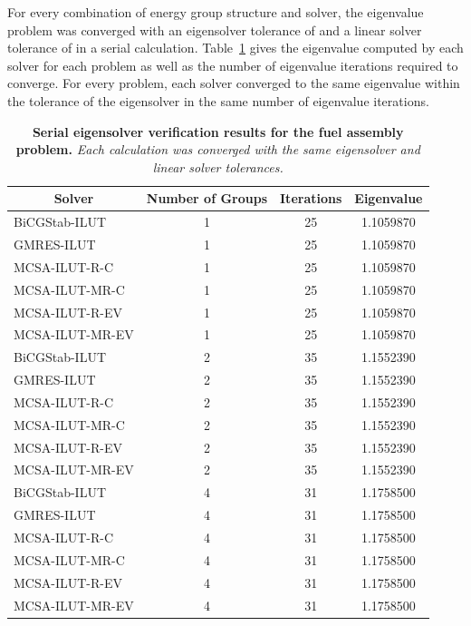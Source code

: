 For every combination of energy group structure and solver, the
eigenvalue problem was converged with an eigensolver tolerance of
 and a linear solver tolerance of  in a serial
calculation. Table~\ref{tab:serial_ev_results} gives the eigenvalue
computed by each solver for each problem as well as the number of
eigenvalue iterations required to converge. For every problem, each
solver converged to the same eigenvalue within the tolerance of the
eigensolver in the same number of eigenvalue iterations.
\begin{table}[h!]
  \begin{center}
    \begin{tabular}{lccc}\hline\hline
      \multicolumn{1}{c}{\textbf{Solver}} & 
      \multicolumn{1}{c}{\textbf{Number of Groups}} & 
      \multicolumn{1}{c}{\textbf{Iterations}} &
      \multicolumn{1}{c}{\textbf{Eigenvalue}} \\
      \hline
      BiCGStab-ILUT & 1 & 25 & 1.1059870 \\
      GMRES-ILUT & 1 & 25 & 1.1059870 \\
      MCSA-ILUT-R-C & 1 & 25 & 1.1059870 \\
      MCSA-ILUT-MR-C & 1 & 25 & 1.1059870 \\
      MCSA-ILUT-R-EV & 1 & 25 & 1.1059870 \\
      MCSA-ILUT-MR-EV & 1 & 25 & 1.1059870 \\
      \hline
      BiCGStab-ILUT & 2 & 35 & 1.1552390 \\
      GMRES-ILUT & 2 & 35 & 1.1552390 \\
      MCSA-ILUT-R-C & 2 & 35 & 1.1552390 \\
      MCSA-ILUT-MR-C & 2 & 35 & 1.1552390 \\
      MCSA-ILUT-R-EV & 2 & 35 & 1.1552390 \\
      MCSA-ILUT-MR-EV & 2 & 35 & 1.1552390 \\
      \hline
      BiCGStab-ILUT & 4 & 31 & 1.1758500 \\
      GMRES-ILUT & 4 & 31 & 1.1758500 \\
      MCSA-ILUT-R-C & 4 & 31 & 1.1758500 \\
      MCSA-ILUT-MR-C & 4 & 31 & 1.1758500 \\
      MCSA-ILUT-R-EV & 4 & 31 & 1.1758500 \\
      MCSA-ILUT-MR-EV & 4 & 31 & 1.1758500 \\
      \hline\hline
    \end{tabular}
  \end{center}
  \caption{\textbf{Serial eigensolver verification results for the
      fuel assembly problem.} \textit{Each calculation was converged
      with the same eigensolver and linear solver tolerances.}}
  \label{tab:serial_ev_results}
\end{table}

